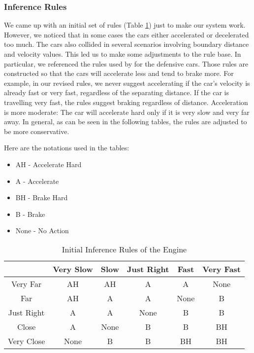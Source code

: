 \documentclass[12pt,letterpaper,oneside]{report}
\begin{document}
\subsubsection{Inference Rules} 
We came up with an initial set of rules (Table
\ref{tbl:init-rules}) just to make our system work. However, we noticed that in
some cases the cars either accelerated or decelerated too much. The cars also 
collided in several scenarios involving boundary distance and velocity values.
This led us to make
some adjustments to the rule base. In particular, we referenced the rules used
by \cite{protzel-fuzzy} for the defensive cars. Those rules are constructed so that
the cars will accelerate less and tend to brake more. 
For example, in our revised rules, we never suggest accelerating if the car's
velocity is already fast or very fast, regardless of the separating distance.
If the car is travelling very fast, the rules suggest braking regardless
of distance. Acceleration is more moderate: The car will accelerate hard only 
if it is very slow and very far away. In general, as can be seen in the 
following tables, the rules are adjusted to be more conservative.

Here are the notations used in the tables:
\begin{itemize}
\item AH - Accelerate Hard
\item A - Accelerate 
\item BH - Brake Hard
\item B - Brake
\item None - No Action
\end{itemize}

\begin{table}[h]
\centering
\caption{Initial Inference Rules of the Engine} \label{tbl:init-rules}
\begin{tabular}{|c||c|c|c|c|c|}
\hline
            & Very Slow & Slow  & Just Right  & Fast  & Very Fast \\ \hline \hline
Very Far    & AH        & AH    & A           & A     & None      \\ \hline
Far         & AH        & A     & A           & None  & B         \\ \hline
Just Right  & A         & A     & None        & B     & B         \\ \hline
Close       & A         & None  & B           & B     & BH        \\ \hline
Very Close  & None      & B     & B           & BH    & BH        \\ \hline
\hline
\end{tabular}
\end{table}
\end{document}
